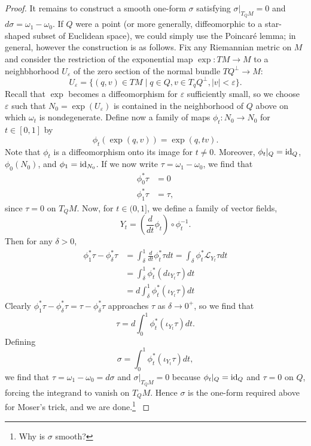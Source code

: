 \documentclass{amsart}
\begin{document}
\begin{proof}
    It remains to construct a smooth one-form $\sigma$ satisfying $\sigma|_{T_QM}=0$ and $d\sigma=\omega_1-\omega_0$.
    If $Q$ were a point (or more generally, diffeomorphic to a star-shaped subset of Euclidean space),
    we could simply use the Poincar\'e lemma; in general, however the construction is as follows.
    Fix any Riemannian metric on $M$ and consider the restriction of the exponential map
    $\exp: TM\to M$ to a neighbhorhood $U_\varepsilon$ of the zero section of the normal bundle
    $TQ^\perp\to M$:
    \begin{equation*}
        U_\varepsilon = \{(q,v)\in TM \mid q\in Q, v\in T_qQ^\perp, |v|<\varepsilon\}.
    \end{equation*}
    Recall that $\exp$ becomes a diffeomorphism for $\varepsilon$ sufficiently small, so we choose
    $\varepsilon$ such that $N_0=\exp(U_\varepsilon)$ is contained in the neighborhood of $Q$ above
    on which $\omega_t$ is nondegenerate. Define now a family of maps $\phi_t:N_0\to N_0$
    for $t\in[0,1]$ by
    \begin{equation*}
        \phi_t(\exp(q,v)) = \exp(q,tv).
    \end{equation*}
    Note that $\phi_t$ is a diffeomorphism onto its image for $t\neq 0$. Moreover, $\phi_t|_Q=\operatorname{id}_Q$,
    $\phi_0(N_0)$, and $\phi_1 = \operatorname{id}_{N_0}$. If we now write $\tau = \omega_1-\omega_0$, we find that
    \begin{align*}
        \phi_0^*\tau &= 0\\
        \phi_1^*\tau &= \tau,
    \end{align*}
    since $\tau=0$ on $T_QM$. Now, for $t\in(0,1]$, we define a family of vector fields,
    \begin{equation*}
        Y_t = \left( \frac{d}{dt}\phi_t \right)\circ\phi_t^{-1}.
    \end{equation*}
    Then for any $\delta>0$,
    \begin{align*}
        \phi_1^*\tau - \phi_\delta^*\tau &= \int_\delta^1 \frac{d}{dt}\phi_t^*\tau dt=\int_\delta\phi_t^*\mathcal{L}_{Y_t}\tau dt\\
        &= \int_\delta^1 \phi_t^*(d\iota_{Y_t}\tau)dt\\
        &= d\int_\delta^1 \phi_t^*(\iota_{Y_t}\tau)dt
    \end{align*}
    Clearly $\phi_1^*\tau-\phi_\delta^*\tau=\tau-\phi_\delta^*\tau$ approaches $\tau$ as $\delta\to0^+$,
    so we find that
    \begin{equation*}
        \tau=d\int_0^1\phi_t^*(\iota_{Y_t}\tau)dt.
    \end{equation*}
    Defining
    \begin{equation*}
        \sigma = \int_0^1\phi_t^*(\iota_{Y_t}\tau) dt,
    \end{equation*}
    we find that $\tau=\omega_1-\omega_0=d\sigma$ and $\sigma|_{T_QM}=0$ because $\phi_t|_Q=\operatorname{id}_Q$ and
    $\tau=0$ on $Q$, forcing the integrand to vanish on $T_QM$. Hence $\sigma$ is the one-form required
    above for Moser's trick, and we are done.\footnote{Why is $\sigma$ smooth?}
    \label{thm:moser}
\end{proof}
\end{document}
